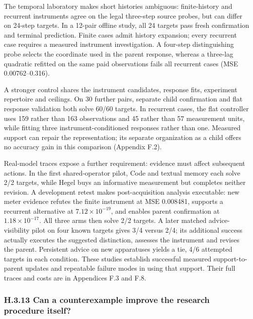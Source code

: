 \documentclass[11pt,a4paper]{article}
\begin{document}
The temporal laboratory makes short histories ambiguous: finite-history and
recurrent instruments agree on the legal three-step source probes, but can differ
on 24-step targets. In a 12-pair offline study, all 24 targets pass fresh
confirmation and terminal prediction. Finite cases admit history expansion;
every recurrent case requires a measured instrument investigation. A four-step
distinguishing probe selects the coordinate used in the parent response, whereas
a three-lag quadratic refitted on the same paid observations fails all recurrent
cases (MSE 0.00762–0.316).


A stronger control shares the instrument candidates, response fits, experiment
repertoire and ceilings. On 30 further pairs, separate child confirmation and
flat response validation both solve 60/60 targets. In recurrent cases, the flat
controller uses 159 rather than 163 observations and 45 rather than 57 measurement
units, while fitting three instrument-conditioned responses rather than one.
Measured support can repair the representation; its separate organization as a
child offers no accuracy gain in this comparison (Appendix F.2).


Real-model traces expose a further requirement: evidence must affect subsequent
actions. In the first shared-operator pilot, Code and textual memory each solve
2/2 targets, while Hegel buys an informative measurement but completes neither
revision. A development retest makes post-acquisition analysis executable: new
meter evidence refutes the finite instrument at MSE 0.008481, supports a recurrent
alternative at \(7.12\times10^{-19}\), and enables parent confirmation at
\(1.18\times10^{-17}\). All three arms then solve 2/2 targets. A later matched
advice-visibility pilot on four known targets gives 3/4 versus 2/4; its additional
success actually executes the suggested distinction, assesses the instrument
and revises the parent. Persistent advice on new apparatuses yields a tie,
4/6 attempted targets in each condition. These studies establish successful
measured support-to-parent updates and repeatable failure modes in using that
support. Their full traces and costs are in Appendices F.3 and F.8.


\subsubsection*{H.3.13 Can a counterexample improve the research procedure itself?}
\end{document}
